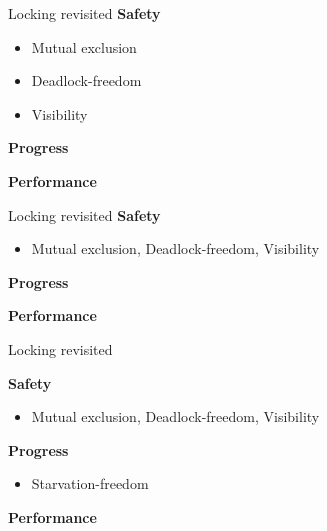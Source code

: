 \begin{frame}[t,noframenumbering]{Locking revisited}
\textbf{Safety}
\begin{itemize}
  \item Mutual exclusion  
  \item Deadlock-freedom
  \item Visibility
\end{itemize}


\textbf{Progress}

\textbf{Performance}
\end{frame}


\begin{frame}[t,noframenumbering]{Locking revisited}
\textbf{Safety}
\begin{itemize}
  \item Mutual exclusion, Deadlock-freedom, Visibility
\end{itemize}

\textbf{Progress}

\textbf{Performance}
\end{frame}


\begin{frame}[t,noframenumbering]{Locking revisited}

\textbf{Safety}
\begin{itemize}
  \item Mutual exclusion, Deadlock-freedom, Visibility
\end{itemize}

\textbf{Progress}
\begin{itemize}
  \item Starvation-freedom  
\end{itemize}


\textbf{Performance}

\end{frame}

